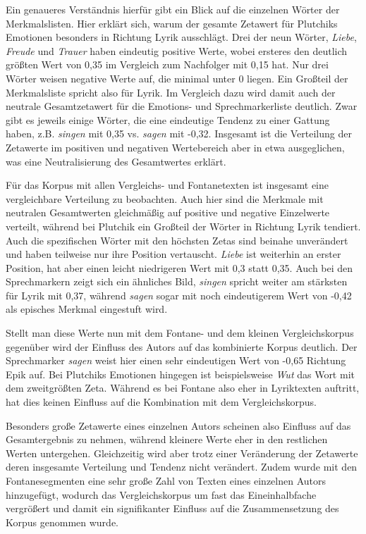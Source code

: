 \documentclass[a4paper,10p]{article}
\begin{document}
Ein genaueres Verständnis hierfür gibt ein Blick auf die einzelnen Wörter der Merkmalslisten. Hier erklärt sich, warum der gesamte Zetawert für Plutchiks Emotionen besonders in Richtung Lyrik ausschlägt. Drei der neun Wörter, \textit{Liebe}, \textit{Freude} und \textit{Trauer} haben eindeutig positive Werte, wobei ersteres den deutlich größten Wert von 0,35 im Vergleich zum Nachfolger mit 0,15 hat. Nur drei Wörter weisen negative Werte auf, die minimal unter 0 liegen. Ein Großteil der Merkmalsliste spricht also für Lyrik. Im Vergleich dazu wird damit auch der neutrale Gesamtzetawert für die Emotions- und Sprechmarkerliste deutlich. Zwar gibt es jeweils einige Wörter, die eine eindeutige Tendenz zu einer Gattung haben, z.B. \textit{singen} mit 0,35 vs. \textit{sagen} mit -0,32. Insgesamt ist die Verteilung der Zetawerte im positiven und negativen Wertebereich aber in etwa ausgeglichen, was eine Neutralisierung des Gesamtwertes erklärt. \par 

Für das Korpus mit allen Vergleichs- und Fontanetexten ist insgesamt eine vergleichbare Verteilung zu beobachten. Auch hier sind die Merkmale mit neutralen Gesamtwerten gleichmäßig auf positive und negative Einzelwerte verteilt, während bei Plutchik ein Großteil der Wörter in Richtung Lyrik tendiert. Auch die spezifischen Wörter mit den höchsten Zetas sind beinahe unverändert und haben teilweise nur ihre Position vertauscht. \textit{Liebe} ist weiterhin an erster Position, hat aber einen leicht niedrigeren Wert mit 0,3 statt 0,35. Auch bei den Sprechmarkern zeigt sich ein ähnliches Bild, \textit{singen} spricht weiter am stärksten für Lyrik mit 0,37, während \textit{sagen} sogar mit noch eindeutigerem Wert von -0,42 als episches Merkmal eingestuft wird. \par 

Stellt man diese Werte nun mit dem Fontane- und dem kleinen Vergleichskorpus gegenüber wird der Einfluss des Autors auf das kombinierte Korpus deutlich. Der Sprechmarker \textit{sagen} weist hier einen sehr eindeutigen Wert von -0,65 Richtung Epik auf. Bei Plutchiks Emotionen hingegen ist beispielsweise \textit{Wut} das Wort mit dem zweitgrößten Zeta. Während es bei Fontane also eher in Lyriktexten auftritt, hat dies keinen Einfluss auf die Kombination mit dem Vergleichskorpus. \par 

Besonders große Zetawerte eines einzelnen Autors scheinen also Einfluss auf das Gesamtergebnis zu nehmen, während kleinere Werte eher in den restlichen Werten untergehen. Gleichzeitig wird aber trotz einer Veränderung der Zetawerte deren insgesamte Verteilung und Tendenz nicht verändert. Zudem wurde mit den Fontanesegmenten eine sehr große Zahl von Texten eines einzelnen Autors hinzugefügt, wodurch das Vergleichskorpus um fast das Eineinhalbfache vergrößert und damit ein signifikanter Einfluss auf die Zusammensetzung des Korpus genommen wurde. \par 
\end{document}
